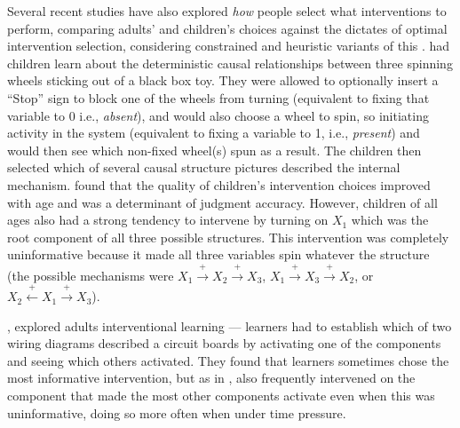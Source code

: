 \documentclass{cambridge7A}%
\begin{document}
Several recent studies have also explored \emph{how} people select what interventions to perform, comparing adults' and children's choices against the dictates of optimal intervention selection,  considering constrained and heuristic variants of this \citep{bramley2015fcs,bramley2017neurath,mccormack2016children,coenen2015strategies,steyvers2003intervention}.  \cite{mccormack2016children} had children learn about the deterministic causal relationships between three spinning wheels sticking out of a black box toy.  They were allowed to optionally insert a ``Stop'' sign to block one of the wheels from turning (equivalent to fixing that variable to 0 i.e., \emph{absent}), and would also choose a wheel to spin, so initiating activity in the system (equivalent to fixing a variable to 1, i.e., \emph{present}) and would then see which non-fixed wheel(s) spun as a result.  The children then selected which of several causal structure pictures described the internal mechanism.  \cite{mccormack2016children} found that the quality of children's intervention choices improved with age and was a determinant of judgment accuracy.  However, children of all ages also had a strong tendency to intervene by turning on $X_1$ which was the root component of all three possible structures.  This intervention was completely uninformative because it made all three variables spin whatever the structure (the possible mechanisms were $X_1\!\stackrel{+}\rightarrow\!X_2\!\stackrel{+}\rightarrow\!X_3$, $X_1\!\stackrel{+}\rightarrow\!X_3\!\stackrel{+}\rightarrow\!X_2$, or $X_2\!\stackrel{+}\leftarrow\!X_1\!\stackrel{+}\rightarrow\!X_3$).

\cite{coenen2015strategies}, explored adults interventional learning --- learners had to establish which of two wiring diagrams described a circuit boards by activating one of the components and seeing which others activated.  They found that learners sometimes chose the most informative intervention, but as in \cite{mccormack2016children}, also frequently intervened on the component that made the most other components activate even when this was uninformative, doing so more often when under time pressure.
\end{document}
